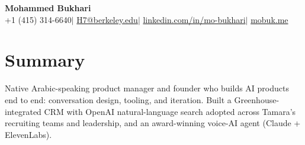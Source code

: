 \documentclass[a4paper,10pt]{article}
\begin{document}
\begin{center}
  {\LARGE\bfseries Mohammed Bukhari}\\[3pt]
  +1 (415) 314-6640\enspace$|$\enspace
  \href{mailto:H7@berkeley.edu}{H7@berkeley.edu}\enspace$|$\enspace
  \href{https://www.linkedin.com/in/mo-bukhari/}{linkedin.com/in/mo-bukhari}\enspace$|$\enspace
  \href{https://mobuk.me}{mobuk.me}
\end{center}
\vspace{-5pt}

\section{Summary}
Native Arabic-speaking product manager and founder who builds AI products end to end: conversation design, tooling, and iteration. Built a Greenhouse-integrated CRM with OpenAI natural-language search adopted across Tamara's recruiting teams and leadership, and an award-winning voice-AI agent (Claude + ElevenLabs).
\end{document}
